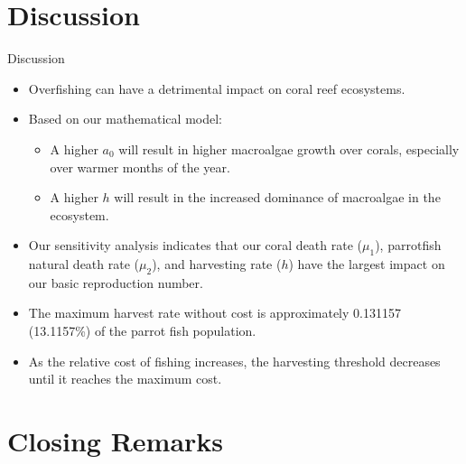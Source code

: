 \documentclass{beamer}
\begin{document}

\section{Discussion}
\begin{frame}{Discussion}
    \begin{itemize}
        \item<1-> Overfishing can have a detrimental impact on coral reef ecosystems.
        \item<2-> Based on our mathematical model:
            \begin{itemize}
                \item A higher $a_{0}$ will result in higher macroalgae growth over corals, especially over warmer months of the year.
                \item A higher $h$ will result in the increased dominance of macroalgae in the ecosystem.
            \end{itemize}
        \item<3-> Our sensitivity analysis indicates that our coral death rate ($\mu_{1}$), parrotfish natural death rate ($\mu_{2}$), and harvesting rate ($h$) have the largest impact on our basic reproduction number.
        \item<4-> The maximum harvest rate without cost is approximately 0.131157 (13.1157\%) of the parrot fish population. 
        \item<5-> As the relative cost of fishing increases, the harvesting threshold decreases until it reaches the maximum cost.
    \end{itemize}
\end{frame}

\section{Closing Remarks}
\end{document}
